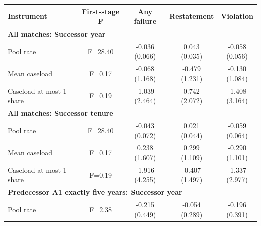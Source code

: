 \documentclass[10pt]{article}
\newcommand{\sym}[1]{\textsuperscript{#1}}
\begin{document}
\begin{minipage}{19cm}\fontsize{10}{12}\selectfont\setlength{\tabcolsep}{4pt}\renewcommand{\arraystretch}{1.12}


\def\sym#1{\ifmmode^{#1}\else\(^{#1}\)\fi}
\centering
{}
\begin{threeparttable}
\begin{tabular}{p{}cccc}
\toprule
Instrument & First-stage F & Any failure & Restatement & Violation \\
\midrule
\multicolumn{5}{l}{\textbf{All matches: Successor year}} \\
Pool rate & F=28.40 & \shortstack{-0.036\\(0.066)} & \shortstack{0.043\\(0.035)} & \shortstack{-0.058\\(0.056)} \\
Mean caseload & F=0.17 & \shortstack{-0.068\\(1.168)} & \shortstack{-0.479\\(1.231)} & \shortstack{-0.130\\(1.084)} \\
Caseload at most 1 share & F=0.19 & \shortstack{-1.039\\(2.464)} & \shortstack{0.742\\(2.072)} & \shortstack{-1.408\\(3.164)} \\
\multicolumn{5}{l}{\textbf{All matches: Successor tenure}} \\
Pool rate & F=28.40 & \shortstack{-0.043\\(0.072)} & \shortstack{0.021\\(0.044)} & \shortstack{-0.059\\(0.064)} \\
Mean caseload & F=0.17 & \shortstack{0.238\\(1.607)} & \shortstack{0.299\\(1.109)} & \shortstack{-0.290\\(1.101)} \\
Caseload at most 1 share & F=0.19 & \shortstack{-1.916\\(4.255)} & \shortstack{-0.407\\(1.497)} & \shortstack{-1.337\\(2.977)} \\
\multicolumn{5}{l}{\textbf{Predecessor A1 exactly five years: Successor year}} \\
Pool rate & F=2.38 & \shortstack{-0.215\\(0.449)} & \shortstack{-0.054\\(0.289)} & \shortstack{-0.196\\(0.391)} \\

\end{tabular}
\end{threeparttable}
\end{minipage}
\end{document}

